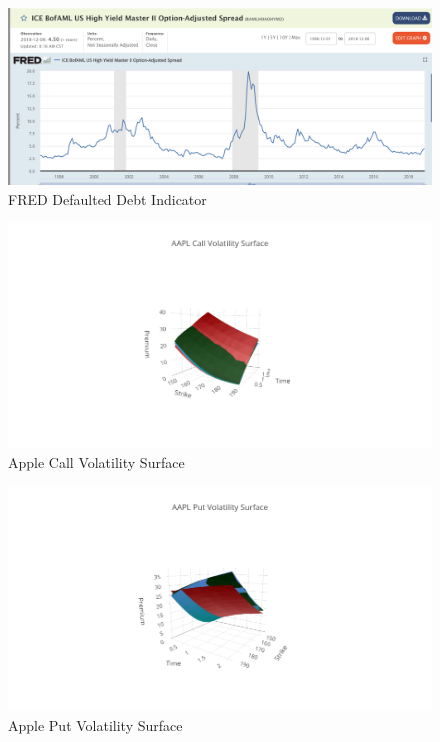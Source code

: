 \documentclass{article}
\begin{document}
\begin{figure}[h!]
\includegraphics[width =\textwidth]{images/BAMF.png}
\caption{FRED Defaulted Debt Indicator}
\centering
\end{figure}


\begin{figure}[h!]
\includegraphics[width =\textwidth]{images/VolSurface/AAPLCall.png}
\caption{Apple Call Volatility Surface}
\centering
\end{figure}
\begin{figure}[h!]
\includegraphics[width =\textwidth]{images/VolSurface/APPLPut.png}
\caption{Apple Put Volatility Surface}
\centering
\end{figure}
\end{document}
